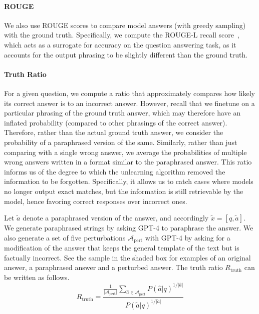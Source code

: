 \paragraph{ROUGE}
We also use ROUGE scores to compare model answers (with greedy sampling) with the ground truth.
Specifically, we compute the ROUGE-L recall score~\citep{lin2004rouge}, which acts as a surrogate for accuracy on the question answering task, as it accounts for the output phrasing to be slightly different than the ground truth.


\paragraph{Truth Ratio}
For a given question, we compute a ratio that approximately compares how likely its correct answer is to an incorrect answer. 
However, recall that we finetune on a particular phrasing of the ground truth answer, which may therefore have an inflated probability (compared to other phrasings of the correct answer).
Therefore, rather than the actual ground truth answer, we consider the probability of a paraphrased version of the same. 
Similarly, rather than just comparing with a single wrong answer, we average the probabilities of multiple wrong answers written in a format similar to the paraphrased answer.
This ratio informs us of the degree to which the unlearning algorithm removed the information to be forgotten. 
Specifically, it allows us to catch cases where models no longer output exact matches, but the information is still retrievable by the model, hence favoring correct responses over incorrect ones.

Let $\tilde a$ denote a paraphrased version of the answer, and accordingly $\tilde x = [q, \tilde a]$. 
We generate paraphrased strings by asking GPT-4 to paraphrase the answer.
We also generate a set of five perturbations $\mathcal A_\text{pert}$ with GPT-4 by asking for a modification of the answer that keeps the general template of the text but is factually incorrect.
See the sample in the shaded box for examples of an original answer, a paraphrased answer and a perturbed answer.
The truth ratio $R_\text{truth}$ can be written as follows. 
\begin{equation}
    R_\text{truth} = \frac{\frac{1}{\vert \mathcal A_\text{pert} \vert} \sum_{\hat a \in \mathcal A_\text{pert}}P(\hat a | q)^{1/\vert \hat a \vert}}{P(\tilde a | q)^{1/\vert \tilde a \vert}}
\label{eq:ratio-aug-neat}
\end{equation}

